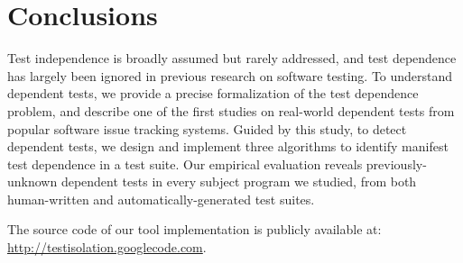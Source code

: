 \section{Conclusions}
\label{sec:questions}

Test independence is broadly assumed but rarely addressed, and
test dependence has largely been ignored in previous
research on software testing. To understand
dependent tests, we provide a
precise formalization of the test dependence problem,
and describe one of the first studies on real-world dependent
tests from popular software issue tracking systems. Guided by
this study, to detect dependent tests, we design
and implement three algorithms to identify manifest test dependence
in a test suite. Our empirical evaluation reveals
previously-unknown dependent tests in every subject program
we studied, from both human-written and automatically-generated test
suites.

The source code of our tool implementation is publicly
available at: \url{http://testisolation.googlecode.com}.

